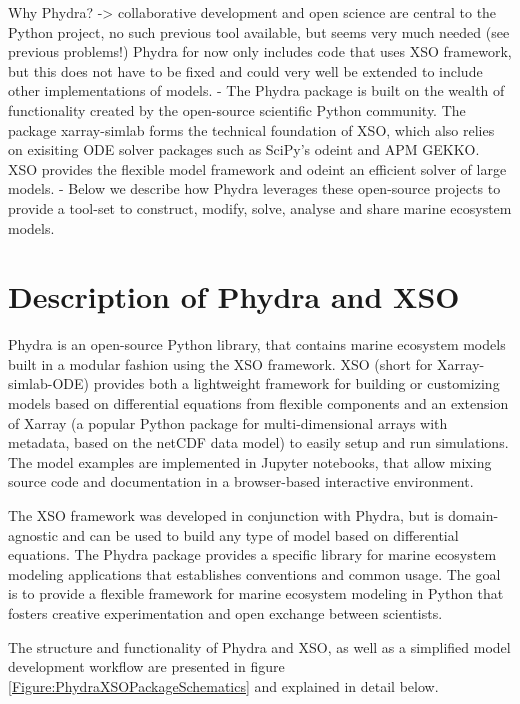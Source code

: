 \documentclass[journal abbreviation, manuscript]{copernicus}
\begin{document}
Why Phydra? -> collaborative development and open science are central to the Python project, no such previous tool available, but seems very much needed (see previous problems!)
Phydra for now only includes code that uses XSO framework, but this does not have to be fixed and could very well be extended to include other implementations of models.
- The Phydra package is built on the wealth of functionality created by the open-source scientific Python community. The package xarray-simlab forms the technical foundation of XSO, which also relies on exisiting ODE solver packages such as SciPy's odeint and APM GEKKO. XSO provides the flexible model framework and odeint an efficient solver of large models. 
- Below we describe how Phydra leverages these open-source projects to provide a tool-set to construct, modify, solve, analyse and share marine ecosystem models. 




\section{Description of Phydra and XSO} \label{Section:phydrapackage}

Phydra is an open-source Python library, that contains marine ecosystem models built in a modular fashion using the XSO framework. XSO (short for Xarray-simlab-ODE) provides both a lightweight framework for building or customizing models based on differential equations from flexible components and an extension of Xarray (a popular Python package for multi-dimensional arrays with metadata, based on the netCDF data model) to easily setup and run simulations. The model examples are implemented in Jupyter notebooks, that allow mixing source code and documentation in a browser-based interactive environment. 

The XSO framework was developed in conjunction with Phydra, but is domain-agnostic and can be used to build any type of model based on differential equations. The Phydra package provides a specific library for marine ecosystem modeling applications that establishes conventions and common usage. The goal is to provide a flexible framework for marine ecosystem modeling in Python that fosters creative experimentation and open exchange between scientists.

The structure and functionality of Phydra and XSO, as well as a simplified model development workflow are presented in figure \ref{Figure:PhydraXSOPackageSchematics} and explained in detail below.
\end{document}
